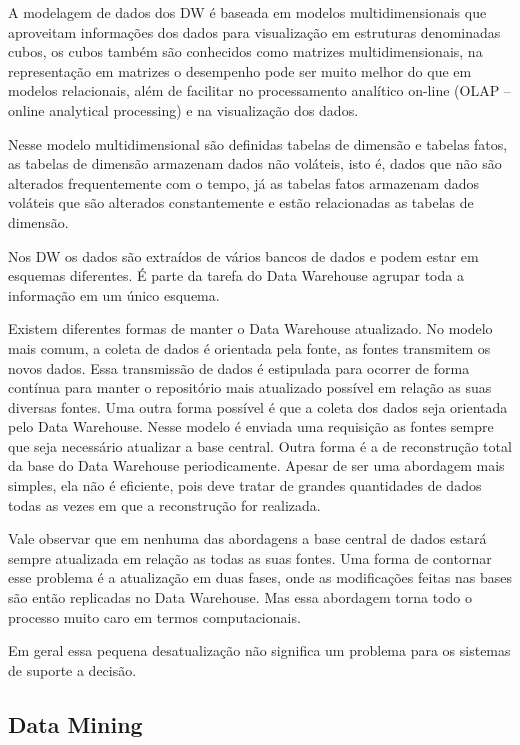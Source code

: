 \documentclass[a4paper,12pt]{article}
\begin{document}
A modelagem de dados dos DW é baseada em modelos multidimensionais que 
aproveitam informações dos dados para visualização em estruturas denominadas
cubos, os cubos também são conhecidos como matrizes multidimensionais, na
representação em matrizes o desempenho pode ser muito melhor do que em modelos
relacionais, além de facilitar no processamento analítico on-line (OLAP – online
analytical processing) e na visualização dos dados.

Nesse modelo multidimensional são definidas tabelas de dimensão e tabelas fatos,
as tabelas de dimensão armazenam dados não voláteis, isto é, dados que não são
alterados frequentemente com o tempo, já as tabelas fatos armazenam dados
voláteis que são alterados constantemente e estão relacionadas as tabelas de
dimensão.

Nos DW os dados são extraídos de vários bancos de dados e podem estar em 
esquemas diferentes. É parte da tarefa do Data Warehouse agrupar toda a
informação em um único esquema.

Existem diferentes formas de manter o Data Warehouse atualizado. No modelo mais
comum, a coleta de dados é orientada pela fonte, as fontes transmitem os novos 
dados. Essa transmissão de dados é estipulada para ocorrer de forma contínua 
para manter o repositório mais atualizado possível em relação as suas diversas 
fontes. Uma outra forma possível é que a coleta dos dados seja orientada pelo 
Data Warehouse. Nesse modelo é enviada uma requisição as fontes sempre que seja 
necessário atualizar a base central. Outra forma é a de reconstrução total da 
base do Data Warehouse periodicamente. Apesar de ser uma abordagem mais simples,
ela não é eficiente, pois deve tratar de grandes quantidades de dados todas as
vezes em que a reconstrução for realizada.

Vale observar que em nenhuma das abordagens a base central de dados estará 
sempre atualizada em relação as todas as suas fontes. Uma forma de contornar esse
problema é a atualização em duas fases, onde as modificações feitas nas bases 
são então replicadas no Data Warehouse. Mas essa abordagem torna todo o processo
muito caro em termos computacionais.

Em geral essa pequena desatualização não significa um problema para os sistemas
de suporte a decisão.

\subsection{\textbf{Data Mining}}
\end{document}
